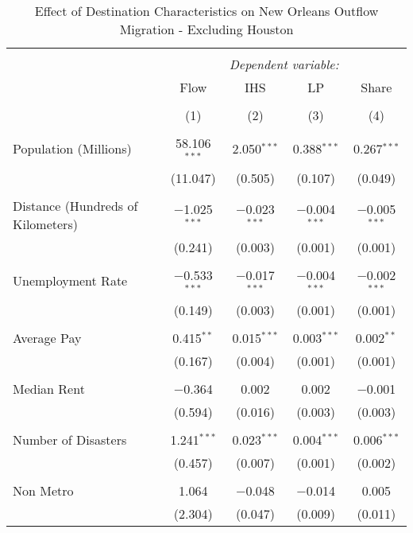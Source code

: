 \documentclass[]{article}
\begin{document}
\clearpage
\scriptsize

\begin{table}[!htbp] \centering 
  \caption{\label{reg:regnoho}Effect of Destination Characteristics on New Orleans Outflow Migration - Excluding Houston} 
  \label{} 
\scriptsize 
\begin{tabular}{@{\extracolsep{5pt}}lcccc} 
\\[-1.8ex]\hline 
\hline \\[-1.8ex] 
 & \multicolumn{4}{c}{\textit{Dependent variable:}} \\ 
\cline{2-5} 
 & Flow & IHS & LP & Share \\ 
\\[-1.8ex] & (1) & (2) & (3) & (4)\\ 
\hline \\[-1.8ex] 
 Population (Millions) & 58.106$^{***}$ & 2.050$^{***}$ & 0.388$^{***}$ & 0.267$^{***}$ \\ 
  & (11.047) & (0.505) & (0.107) & (0.049) \\ 
  & & & & \\ 
 Distance (Hundreds of Kilometers) & $-$1.025$^{***}$ & $-$0.023$^{***}$ & $-$0.004$^{***}$ & $-$0.005$^{***}$ \\ 
  & (0.241) & (0.003) & (0.001) & (0.001) \\ 
  & & & & \\ 
 Unemployment Rate & $-$0.533$^{***}$ & $-$0.017$^{***}$ & $-$0.004$^{***}$ & $-$0.002$^{***}$ \\ 
  & (0.149) & (0.003) & (0.001) & (0.001) \\ 
  & & & & \\ 
 Average Pay & 0.415$^{**}$ & 0.015$^{***}$ & 0.003$^{***}$ & 0.002$^{**}$ \\ 
  & (0.167) & (0.004) & (0.001) & (0.001) \\ 
  & & & & \\ 
 Median Rent & $-$0.364 & 0.002 & 0.002 & $-$0.001 \\ 
  & (0.594) & (0.016) & (0.003) & (0.003) \\ 
  & & & & \\ 
 Number of Disasters & 1.241$^{***}$ & 0.023$^{***}$ & 0.004$^{***}$ & 0.006$^{***}$ \\ 
  & (0.457) & (0.007) & (0.001) & (0.002) \\ 
  & & & & \\ 
 Non Metro & 1.064 & $-$0.048 & $-$0.014 & 0.005 \\ 
  & (2.304) & (0.047) & (0.009) & (0.011) \\ 

\end{tabular}
\end{table}
\end{document}

